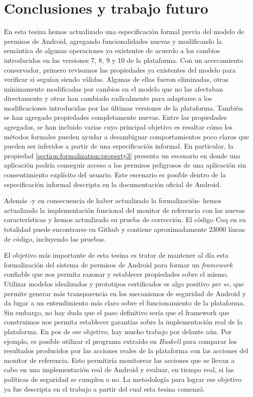 \chapter{Conclusiones y trabajo futuro}
\label{chapter:conclusion}

En esta tesina hemos actualizado una especificación formal previa del modelo de permisos de
Android\cite{luna-cleiej,betarte-2016}, agregando funcionalidades nuevas y modificando la semántica
de algunas operaciones ya existentes de acuerdo a los cambios introducidos en las versiones 7, 8, 9
y 10 de la plataforma. Con un acercamiento conservador, primero revisamos las propiedades ya
existentes del modelo para verificar si seguían siendo válidas. Algunas de ellas fueron eliminadas,
otras mínimamente modificadas por cambios en el modelo que no las afectaban directamente y otras han
cambiado radicalmente para adaptarse a los modificaciones introducidas por las últimas versiones de
la plataforma. También se han agregado propiedades completamente nuevas. Entre las propiedades
agregadas, se han incluido varias cuyo principal objetivo es resaltar cómo los métodos formales
pueden ayudar a desambiguar comportamientos poco claros que pueden ser inferidos a partir de una
especificación informal. En particular, la propiedad \ref{section:formalization:property3} presenta
un escenario en donde una aplicación podría conseguir acceso a los permisos peligrosos de una
aplicación sin consentimiento explícito del usuario. Este escenario es posible dentro de la
especificación informal descripta en la documentación oficial de Android.

Además -y en consecuencia de haber actualizado la formalización- hemos actualizado la implementación
funcional del monitor de referencia con las nuevas características y hemos actualizado su prueba de
corrección. El código Coq en su totalidad puede encontrarse en Github\cite{github-code} y contiene
aproximadamente 23000 líneas de código, incluyendo las pruebas.

El objetivo más importante de esta tesina es tratar de mantener al día esta formalización del
sistema de permisos de Android para formar un \textit{framework} confiable que nos permita razonar y
establecer propiedades sobre el mismo. Utilizar modelos idealizados y prototipos certificados es
algo positivo \textit{per se}, que permite generar más transparencia en los mecanismos de seguridad
de Android y da lugar a un entendimiento más claro sobre el funcionamiento de la plataforma. Sin
embargo, no hay duda que el paso definitivo sería que el framework que construimos nos permita
establecer garantías sobre la implementación real de la plataforma. En pos de ese objetivo, hay
mucho trabajo por delante aún. Por ejemplo, es posible utilizar el programa extraído en
\textit{Haskell} para comparar los resultados producidos por las acciones reales de la plataforma
con las acciones del monitor de referencia. Esto permitiría monitorear las acciones que se llevan a
cabo en una implementación real de Android y evaluar, en tiempo real, si las políticas de seguridad
se cumplen o no. La metodología para lograr ese objetivo ya fue descripta en el trabajo a partir del
cual esta tesina comenzó\cite{luna-cleiej}.

